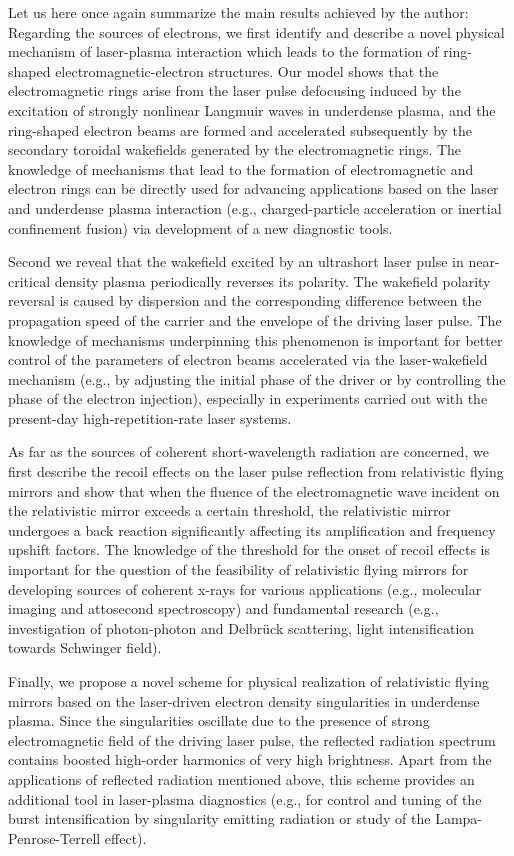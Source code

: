 \documentclass[10pt, a4paper, twoside, openright]{report}
\begin{document}
Let us here once again summarize the main results achieved by the author: Regarding the sources of electrons, we first identify and describe a novel physical mechanism of laser-plasma interaction which leads to the formation of ring-shaped electromagnetic-electron structures. Our model shows that the electromagnetic rings arise from the laser pulse defocusing induced by the excitation of strongly nonlinear Langmuir waves in underdense plasma, and the ring-shaped electron beams are formed and accelerated subsequently by the secondary toroidal wakefields generated by the electromagnetic rings. The knowledge of mechanisms that lead to the formation of electromagnetic and electron rings can be directly used for advancing applications based on the laser and underdense plasma interaction (e.g., charged-particle acceleration or inertial confinement fusion) via development of a new diagnostic tools. 

Second we reveal that the wakefield excited by an ultrashort laser pulse in near-critical density plasma periodically reverses its polarity. The wakefield polarity reversal is caused by dispersion and the corresponding difference between the propagation speed of the carrier and the envelope of the driving laser pulse. The knowledge of mechanisms underpinning this phenomenon is important for better control of the parameters of electron beams accelerated via the laser-wakefield mechanism (e.g., by adjusting the initial phase of the driver or by controlling the phase of the electron injection), especially in experiments carried out with the present-day high-repetition-rate laser systems.

As far as the sources of coherent short-wavelength radiation are concerned, we first describe the recoil effects on the laser pulse reflection from relativistic flying mirrors and show that when the fluence of the electromagnetic wave incident on the relativistic mirror exceeds a certain threshold, the relativistic mirror undergoes a back reaction significantly affecting its amplification and frequency upshift factors. The knowledge of the threshold for the onset of recoil effects is important for the question of the feasibility of relativistic flying mirrors for developing sources of coherent x-rays for various applications (e.g., molecular imaging and attosecond spectroscopy) and fundamental research (e.g., investigation of photon-photon and Delbrück scattering, light intensification towards Schwinger field).

Finally, we propose a novel scheme for physical realization of relativistic flying mirrors based on the laser-driven electron density singularities in underdense plasma. Since the singularities oscillate due to the presence of strong electromagnetic field of the driving laser pulse, the reflected radiation spectrum contains boosted high-order harmonics of very high brightness. Apart from the applications of reflected radiation mentioned above, this scheme provides an additional tool in laser-plasma diagnostics (e.g., for control and tuning of the burst intensification by singularity emitting radiation or study of the Lampa-Penrose-Terrell effect).
\end{document}
